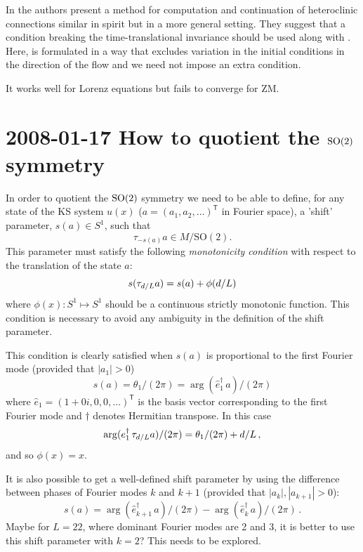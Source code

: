 In  the authors present a
method for computation and continuation of heteroclinic
connections similar in spirit but in a more general setting.
They suggest that a condition breaking the time-translational
invariance should be used along with .
Here,  is formulated in a way that
excludes variation in the initial conditions in the direction
of the flow and we need not impose an extra condition.

It works well for Lorenz equations but fails to converge for ZM.



\section{2008-01-17 How to quotient the $\textrm{SO}(2)$ symmetry}
\label{2008-01-17How2QuotientSO2}

\medskip{}
In order to quotient the $\textrm{SO}(2)$ symmetry we need to be able to define,
for any state of the KS system $u(x)$
($a = (a_1, a_2, \ldots)^\mathsf{T}$ in Fourier space),
a 'shift' parameter, $s(a) \in S^1 $, such that
\[ \tau_{-s(a)} a \in M/\mathrm{SO}(2). \]
This parameter must satisfy the following {\em monotonicity condition} with
respect to the translation of the state $a$:
\[ s(\tau_{d/L}a) = s(a) + \phi(d/L) \]
where $\phi(x): S^1 \mapsto S^1$ should be a continuous strictly monotonic function.
This condition is necessary to avoid any ambiguity in the definition of
the shift parameter.

This condition is clearly satisfied when $s(a)$ is proportional to
the first Fourier mode (provided that $|a_1| > 0$)
\begin{equation}
  s(a) =  \theta_1/(2\pi) = \arg(\hat{e}_1^\dagger\,a)/(2\pi)
\label{eq:shift1} \end{equation}
where $\hat{e}_1 = (1+0i, 0, 0, \ldots)^\mathsf{T}$ is the basis vector corresponding
to the first Fourier mode and $\dagger$ denotes Hermitian transpose.
In this case
\[ \arg (e_1^\dagger\,\tau_{d/L}a)/(2\pi) = \theta_1/(2\pi) + d/L\,, \]
and so $\phi(x) = x$.

It is also possible to get a well-defined shift parameter by
using the difference between phases of Fourier modes $k$ and $k+1$ (provided
that $|a_k|, |a_{k+1}| > 0$):
\begin{equation}
  s(a) = \arg(\hat{e}_{k+1}^\dagger\,a)/(2\pi) -
  \arg(\hat{e}_{k}^\dagger\,a)/(2\pi)\,.
  \label{eq:shiftk} \end{equation}
Maybe for $L = 22$, where dominant Fourier modes are 2 and 3, it is better to use
this shift parameter with $k = 2$?  This needs to be explored.

